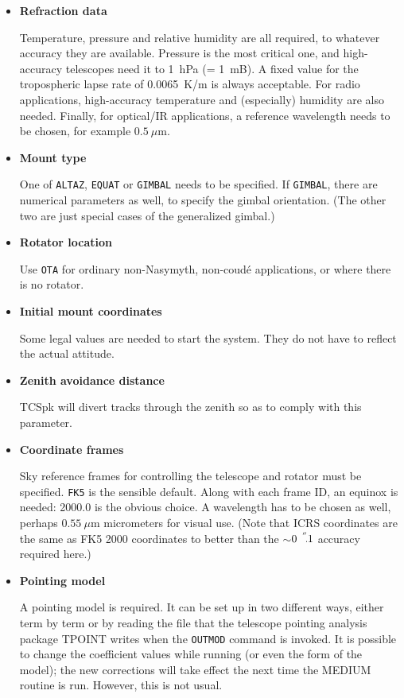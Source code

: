 \documentclass[12pt,fleqn,twoside]{article}
\renewcommand{\_}{{\tt\char'137}}     %
\newcommand{\arcsec}[2] {\arcseci{#1}$\hspace{-0.4em}.#2$}
\newcommand{\arcseci}[1] {$#1\hspace{0.05em}$\raisebox{-0.5ex}
                         {$^{'\hspace{-0.1em}'}$}}
\begin{document}
\begin{itemize}
\item {\bf Refraction data}

      Temperature, pressure and relative humidity are all
      required, to whatever accuracy they are available.
      Pressure is the most critical one, and high-accuracy
      telescopes need it to 1~hPa (= 1~mB).  A fixed value for the
      tropospheric lapse rate of 0.0065~K/m is always
      acceptable.  For radio applications, high-accuracy
      temperature and (especially) humidity are also needed.  Finally,
      for optical/IR applications, a reference wavelength
      needs to be chosen, for example $0.5~\mu$m.

\item {\bf Mount type}

      One of {\tt ALTAZ}, {\tt EQUAT} or {\tt GIMBAL} needs to
      be specified.  If {\tt GIMBAL},
      there are numerical parameters as well, to specify the
      gimbal orientation.  (The other two are just special cases
      of the generalized gimbal.)

\item {\bf Rotator location}

      Use {\tt OTA} for ordinary non-Nasymyth, non-coud\'{e} applications,
      or where there is no rotator.

\item {\bf Initial mount coordinates}

      Some legal values are needed to start the system.  They
      do not have to reflect the actual attitude.

\item {\bf Zenith avoidance distance}

      TCSpk will divert tracks through the zenith so as to comply with
      this parameter.

\item {\bf Coordinate frames}

      Sky reference frames for controlling the telescope and rotator
      must be specified.  {\tt FK5} is the sensible default.  Along
      with each frame ID, an equinox is needed:  2000.0 is the
      obvious choice.  A wavelength has to be chosen as well,
      perhaps $0.55~\mu$m micrometers for visual use.  (Note that
      ICRS coordinates are the same as FK5 2000 coordinates to
      better than the $\sim$\arcsec{0}{1} accuracy required here.)

\item {\bf Pointing model}

      A pointing model is required.  It can be set up in two
      different ways, either term by term or by reading the file
      that the telescope pointing analysis package TPOINT writes
      when the {\tt OUTMOD} command is invoked.  It is possible to change
      the coefficient values while running (or even the form of
      the model);  the new corrections will take effect the
      next time the MEDIUM routine is run.  However, this is not
      usual.


\end{itemize}
\end{document}
